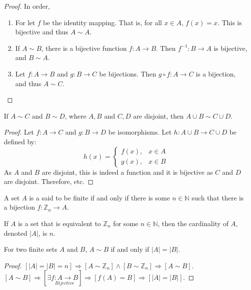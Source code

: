     \begin{proof}
    In order,
    \begin{enumerate}
    \item   For let $f$ be the identity mapping. That is, for all
            $x\in A$, $f(x)=x$. This is bijective and thus $A\sim A$.
    \item   If $A\sim B$, there is a bijective function $f:A\rightarrow B$.
            Then $f^{-1}:B\rightarrow A$ is bijective, and $B\sim A$.
    \item   Let $f:A\rightarrow B$ and $g:B\rightarrow C$ be bijections.
            Then $g\circ f:A\rightarrow C$ is a bijection,
            and thus $A\sim C$.
    \end{enumerate}
    \end{proof}
    \begin{theorem}
        If $A\sim{C}$ and $B\sim{D}$, where $A,B$ and $C,D$ are disjoint,
        then $A\cup{B}\sim{C}\cup{D}$.
    \end{theorem}
    \begin{proof}
        Let $f:A\rightarrow C$ and $g:B\rightarrow D$ be isomorphisms.
        Let $h:A\cup{B}\rightarrow{C}\cup{D}$ be defined by:
        \begin{equation}
            h(x)=
            \begin{cases}
                f(x),&x\in{A}\\
                g(x),&x\in{B}
            \end{cases}
        \end{equation}
        As $A$ and $B$ are disjoint, this is indeed a function and it is
        bijective as $C$ and $D$ are disjoint. Therefore, etc.
    \end{proof}
    \begin{definition}
    A set $A$ is a said to be finite if and only if there is some $n\in \mathbb{N}$ such
    that there is a bijection $f:\mathbb{Z}_n \rightarrow A$.
    \end{definition}
    \begin{definition}
    If $A$ is a set that is equivalent to $\mathbb{Z}_n$ for some $n\in \mathbb{N}$,
    then the cardinality of $A$, denoted $|A|$, is $n$.
    \end{definition}
    \begin{theorem}
    For two finite sets $A$ and $B$, $A\sim B$ if and only if $|A|=|B|$.
    \end{theorem}
    \begin{proof}
    $[|A|=|B|=n]\Rightarrow[A\sim \mathbb{Z}_n]\land[B\sim \mathbb{Z}_n]\Rightarrow [A\sim B]$.
    $[A\sim B]\Rightarrow [\exists \underset{Bijective}{f:A\rightarrow B}]\Rightarrow [f(A) = B]\Rightarrow [|A|=|B|]$.
    \end{proof}
